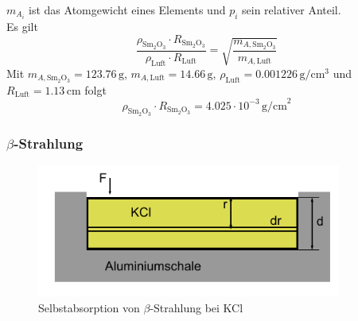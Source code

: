 ${m_{A_i}}$ ist das Atomgewicht eines Elements und $p_i$ sein relativer Anteil.\\
Es gilt
\begin{equation}
  \frac{\rho_{\text{Sm}_2\text{O}_3} \cdot R_{\text{Sm}_2\text{O}_3}} {\rho_{\text{Luft}} \cdot R_{\text{Luft}}}
  =\sqrt{\frac{m_{A,\text{Sm}_2\text{O}_3}}{m_{A,\text{Luft}}}}
\end{equation}
Mit $m_{A,\text{Sm}_2\text{O}_3} = 123.76 \, \text{g}$, $m_{A,\text{Luft}} =14.66\, \text{g}$,
$\rho_{\text{Luft}} = 0.001226\,\text{g} / \text{cm}^3$ und 
$R_{\text{Luft}} = 1.13$\,cm folgt
\begin{equation}
\label{eq:samarium:Rrho}
  \rho_{\text{Sm}_2\text{O}_3} \cdot R_{\text{Sm}_2\text{O}_3} =
  4.025 \cdot 10^{-3} \, \text{g/cm}^2
\end{equation}


\subsubsection{$\beta$-Strahlung}

\begin{figure}[H]
\begin{center}
  \includegraphics[width=10cm]{../img/absbeta}
  \caption{Selbstabsorption von $\beta$-Strahlung bei KCl}
  \label{img:absbeta}
\end{center}
\end{figure}

